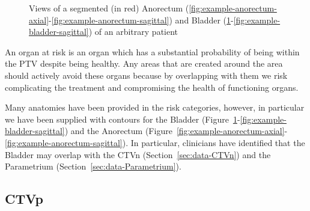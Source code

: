 \documentclass[11pt,twoside]{report}
\begin{document}
\begin{figure}[H]
{   \label{fig:example-bladder-axial}
  }
  \caption{Views of a segmented (in red) Anorectum (\ref{fig:example-anorectum-axial}-\ref{fig:example-anorectum-sagittal}) and Bladder (\ref{fig:example-bladder-axial}-\ref{fig:example-bladder-sagittal}) of an arbitrary patient}
\end{figure}

An organ at risk is an organ which has a substantial probability of being within the PTV despite being healthy. Any areas that are created around the area should actively avoid these organs because by overlapping with them we risk complicating the treatment and compromising the health of functioning organs.

Many anatomies have been provided in the risk categories, however, in particular we have been supplied with contours for the Bladder (Figure~\ref{fig:example-bladder-axial}-\ref{fig:example-bladder-sagittal}) and the Anorectum (Figure~\ref{fig:example-anorectum-axial}-\ref{fig:example-anorectum-sagittal}). In particular, clinicians have identified that the Bladder may overlap with the CTVn (Section~\ref{sec:data-CTVn}) and the Parametrium (Section~\ref{sec:data-Parametrium}).

\subsection{CTVp}\label{sec:data-CTVp}
\end{document}
